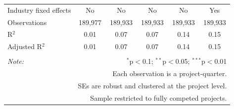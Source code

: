 \documentclass[
]{article}
\begin{document}
\begin{table}[H]
\begin{tabular}{@{\extracolsep{-2pt}}lccccc}
Industry fixed effects & No & No & No & No & Yes \\ 
Observations & 189,977 & 189,933 & 189,933 & 189,933 & 189,933 \\ 
R$^{2}$ & 0.01 & 0.07 & 0.07 & 0.14 & 0.15 \\ 
Adjusted R$^{2}$ & 0.01 & 0.07 & 0.07 & 0.14 & 0.15 \\ 
\hline 
\hline \\[-1.8ex] 
\textit{Note:}  & \multicolumn{5}{r}{$^{*}$p$<$0.1; $^{**}$p$<$0.05; $^{***}$p$<$0.01} \\ 
 & \multicolumn{5}{r}{Each observation is a project-quarter.} \\ 
 & \multicolumn{5}{r}{SEs are robust and clustered at the project level.} \\ 
 & \multicolumn{5}{r}{Sample restricted to fully competed projects.} \\ 
\end{tabular} 
\end{table}
\end{document}
